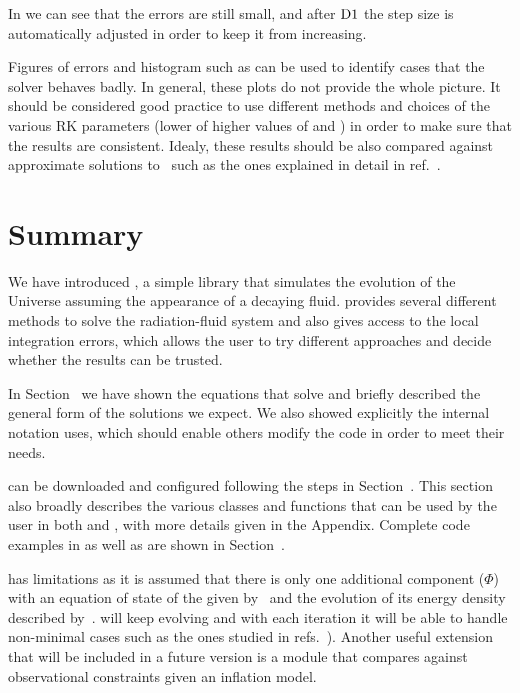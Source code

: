 \documentclass[11pt,a4paper]{article}
\begin{document}
%
In  we can see that the errors are still small, and after ${\rm D1}{}$ the step size is automatically adjusted in order to keep it from increasing.

Figures of errors and histogram such as  can be used to identify cases that the solver behaves badly. In general, these plots do not provide the whole picture. It should be considered good practice to use different methods and choices of the various RK parameters (\eg lower of higher values of  and ) in order to make sure that the results are consistent. Idealy, these results should be also compared against approximate solutions to~ such as the ones explained in detail in ref.~\cite{Arias:2020qty}.

\section{Summary}\label{sec:summary}
%
We have introduced \nsc, a simple library that simulates the evolution of the Universe assuming the appearance of a decaying fluid. \nsc provides several different methods to solve the radiation-fluid system and also gives access to the local integration errors, which allows the user to try different approaches and decide whether the results can be trusted.

In Section~ we have shown the equations that \nsc solve and briefly described the general form of the solutions we expect. We also showed explicitly the internal notation \nsc uses, which should enable others modify the code in order to meet their needs. 

\nsc can be downloaded and configured following the steps in Section~. This section also broadly describes the various classes and functions that can be used by the user in both \CPP and \PY, with more details given in the Appendix. Complete code examples in \CPP as well as \PY are shown in Section~.

\nsc has limitations as it is assumed that there is only one additional component ($\Phi$) with an equation of state of the given by~ and the evolution of its energy density described by~. \nsc will keep evolving and with each iteration it will be able to handle non-minimal cases such as the ones studied in refs.~\cite{Barman:2022tzk,Arias:2022qjt,Dienes:2021woi}). Another useful extension that will be included in a future version is a module that compares against observational constraints given an inflation model. 
\end{document}
